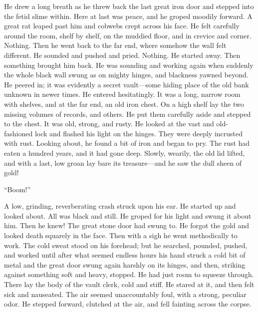 He drew a long breath as he threw back the last great iron door
and stepped into the fetid slime within. Here at last was peace,
and he groped moodily forward. A great rat leaped past him and
cobwebs crept across his face. He felt carefully around the
room, shelf by shelf, on the muddied floor, and in crevice and
corner. Nothing. Then he went back to the far end, where somehow
the wall felt different. He sounded and pushed and pried.
Nothing. He started away. Then something brought him back. He
was sounding and working again when suddenly the whole black
wall swung as on mighty hinges, and blackness yawned beyond. He
peered in; it was evidently a secret vault---some hiding place of
the old bank unknown in newer times. He entered hesitatingly. It
was a long, narrow room with shelves, and at the far end, an old
iron chest. On a high shelf lay the two missing volumes of
records, and others. He put them carefully aside and stepped to
the chest. It was old, strong, and rusty. He looked at the vast
and old-fashioned lock and flashed his light on the hinges. They
were deeply incrusted with rust. Looking about, he found a bit
of iron and began to pry. The rust had eaten a hundred years,
and it had gone deep. Slowly, wearily, the old lid lifted, and
with a last, low groan lay bare its treasure---and he saw the dull
sheen of gold!

``Boom!''

A low, grinding, reverberating crash struck upon his ear. He
started up and looked about. All was black and still. He groped
for his light and swung it about him. Then he knew! The great
stone door had swung to. He forgot the gold and looked death
squarely in the face. Then with a sigh he went methodically to
work. The cold sweat stood on his forehead; but he searched,
pounded, pushed, and worked until after what seemed endless
hours his hand struck a cold bit of metal and the great door
swung again harshly on its hinges, and then, striking against
something soft and heavy, stopped. He had just room to squeeze
through. There lay the body of the vault clerk, cold and stiff.
He stared at it, and then felt sick and nauseated. The air
seemed unaccountably foul, with a strong, peculiar odor. He
stepped forward, clutched at the air, and fell fainting across
the corpse.

